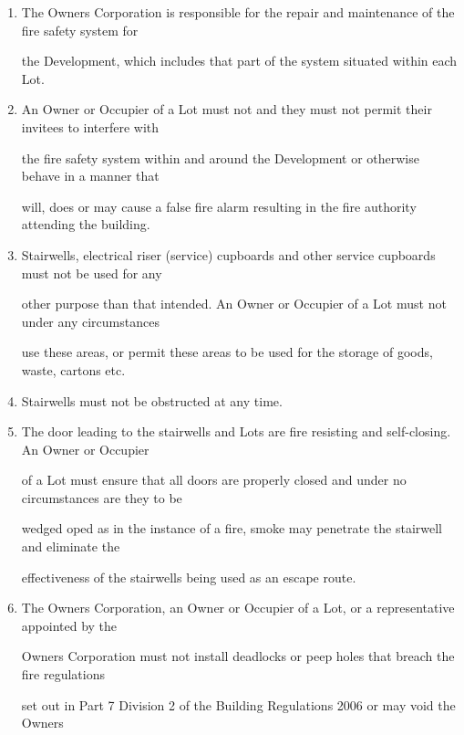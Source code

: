 \documentclass{article}
\begin{document}
\begin{enumerate}[label=\arabic*.]
\begin{enumerate}[label=\arabic{enumi}.\arabic*.]
\begin{enumerate}[label=(\arabic*)]
\begin{enumerate}[label=(\alph*)]
(iii) restrict by means of key or other security device the access of the Owners or Occupiers of one 

level of the Building any other level of the Building. 

\item  The Owners Corporation is responsible for the repair and maintenance of the fire safety system for 

the Development, which includes that part of the system situated within each Lot. 

\item  An Owner or Occupier of a Lot must not and they must not permit their invitees to interfere with 

the fire safety system within and around the Development or otherwise behave in a manner that 

will, does or may cause a false fire alarm resulting in the fire authority attending the building. 

\newpage

\item  Stairwells, electrical riser (service) cupboards and other service cupboards must not be used for any 

other purpose than that intended. An Owner or Occupier of a Lot must not under any circumstances 

use these areas, or permit these areas to be used for the storage of goods, waste, cartons etc. 

\item  Stairwells must not be obstructed at any time. 

\item  The door leading to the stairwells and Lots are fire resisting and self-closing. An Owner or Occupier 

of a Lot must ensure that all doors are properly closed and under no circumstances are they to be 

wedged oped as in the instance of a fire, smoke may penetrate the stairwell and eliminate the 

effectiveness of the stairwells being used as an escape route. 

\item  The Owners Corporation, an Owner or Occupier of a Lot, or a representative appointed by the 

Owners Corporation must not install deadlocks or peep holes that breach the fire regulations 

set out in Part 7 Division 2 of the Building Regulations 2006 or may void the Owners 


\end{enumerate}
\end{enumerate}
\end{enumerate}
\end{enumerate}
\end{document}
